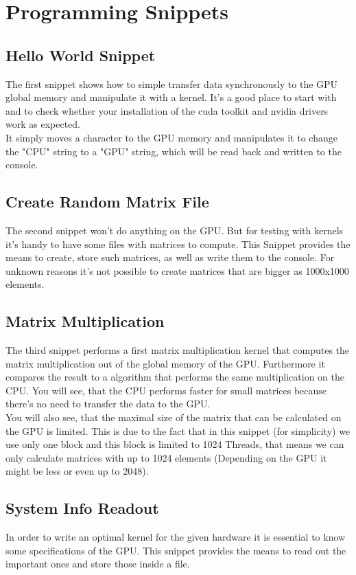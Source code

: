 \chapter{Programming Snippets}

\section{Hello World Snippet}
The first snippet shows how to simple transfer data synchronously to the GPU global memory and manipulate it with a kernel. It's a good place to start with and to check whether your installation of the cuda toolkit and nvidia drivers work as expected.\\

It simply moves a character to the GPU memory and manipulates it to change the "CPU" string to a "GPU" string, which will be read back and written to the console.


\section{Create Random Matrix File}
The second snippet won't do anything on the GPU. But for testing with kernels it's handy to have some files with matrices to compute. This Snippet provides the means to create, store such matrices, as well as write them to the console. For unknown reasons it's not possible to create matrices that are bigger as 1000x1000 elements.

\section{Matrix Multiplication}
The third snippet performs a first matrix multiplication kernel that computes the matrix multiplication out of the global memory of the GPU. Furthermore it compares the result to a algorithm that performs the same multiplication on the CPU. You will see, that the CPU performs faster for small matrices because there's no need to transfer the data to the GPU.\\

You will also see, that the maximal size of the matrix that can be calculated on the GPU is limited. This is due to the fact that in this snippet (for simplicity) we use only one block and this block is limited to 1024 Threads, that means we can only calculate matrices with up to 1024 elements (Depending on the GPU it might be less or even up to 2048).


\section{System Info Readout}
In order to write an optimal kernel for the given hardware it is essential to know some specifications of the GPU. This snippet provides the means to read out the important ones and store those inside a file.\\

